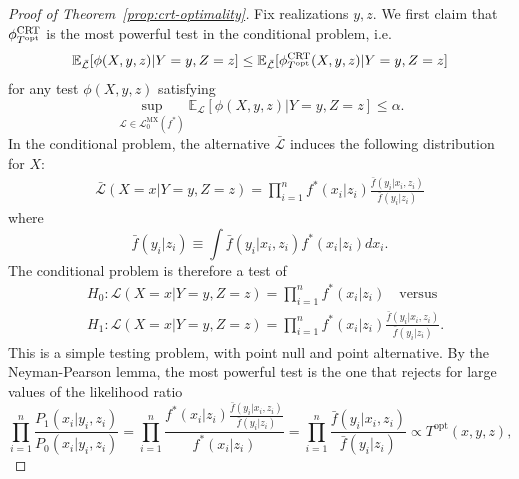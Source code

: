 \documentclass[12pt]{article}
\theoremstyle{definition}
\theoremstyle{remark}
\newcommand{\srx}{X}
\newcommand{\sfx}{x}
\newcommand{\srz}{Z}
\newcommand{\sfz}{z}
\newcommand{\sry}{Y}
\newcommand{\sfy}{y}
\def\CRT{\textnormal{CRT}}
\begin{document}
\begin{proof}[Proof of Theorem~\ref{prop:crt-optimality}]
	Fix realizations $\sfy, \sfz$. We first claim that $\phi^{\CRT}_{T^{\textnormal{opt}}}$ is the most powerful test in the conditional problem, i.e.
	\begin{equation}
		\mathbb E_{\bar{\mathcal L}}[\phi(\srx,\sfy,\sfz)|\sry = \sfy, \srz = \sfz] \leq \mathbb E_{\bar{\mathcal L}}[\phi^{\CRT}_{T^\textnormal{opt}}(\srx, \sfy, \sfz)|\sry = \sfy, \srz = \sfz]
		\label{conditional-optimality}
	\end{equation}
	for any test $\phi(\srx, \sfy, \sfz)$ satisfying
	\begin{equation}
		\sup_{\mathcal L \in \mathscr L_0^{\text{MX}}(f^*)}\mathbb E_{\mathcal L}[\phi(\srx,\sfy,\sfz)|\sry = \sfy, \srz = \sfz] \leq \alpha.
		\label{eq:conditional-level}
	\end{equation}
	In the conditional problem, the alternative $\bar{\mathcal L}$ induces the following distribution for $\srx$:
	\begin{equation}
		\begin{split}
			\bar{\mathcal L}(\srx = \sfx|\sry = \sfy, \srz = \sfz) = \prod_{i = 1}^n  f^*(\sfx_i|\sfz_i)\tfrac{\bar f(\sfy_i|\sfx_i, \sfz_i)}{\bar f(\sfy_i|\sfz_i)}
			\label{conditional-alternative}
		\end{split}
	\end{equation}
	where
	\begin{equation*}
	\bar f(\sfy_i|\sfz_i) \equiv \int \bar f(\sfy_i|\sfx_i, \sfz_i)f^*(\sfx_i|\sfz_i)d\sfx_i.
	\end{equation*}	
	The conditional problem is therefore a test of 
	\begin{equation*}
		\begin{split}
			&H_0: \mathcal L(\srx = \sfx|\sry = \sfy, \srz = \sfz) = \prod_{i = 1}^n  f^*(\sfx_i | \sfz_i) \quad \text{versus} \\
			&H_1: \mathcal L(\srx = \sfx|\sry = \sfy, \srz = \sfz) = \prod_{i = 1}^n  f^*(\sfx_i|\sfz_i)\tfrac{\bar f(\sfy_i|\sfx_i, \sfz_i)}{\bar f(\sfy_i|\sfz_i)}.
		\end{split}
	\end{equation*}
	This is a simple testing problem, with point null and point alternative. By the Neyman-Pearson lemma, the most powerful test is the one that rejects for large values of the likelihood ratio
	\begin{equation}
		\prod_{i = 1}^n \frac{P_1(\sfx_i|\sfy_i, \sfz_i)}{P_0(\sfx_i|\sfy_i, \sfz_i)} = \prod_{i = 1}^n \frac{f^*(\sfx_i|\sfz_i)\frac{\bar f(\sfy_i|\sfx_i, \sfz_i)}{\bar f(\sfy_i|\sfz_i)}}{f^*(\sfx_i|\sfz_i)} = \prod_{i = 1}^n \frac{\bar f(\sfy_i|\sfx_i, \sfz_i)}{\bar f(\sfy_i|\sfz_i)} \propto T^{\text{opt}}(\sfx, \sfy, \sfz),

\end{equation}
\end{proof}
\end{document}
